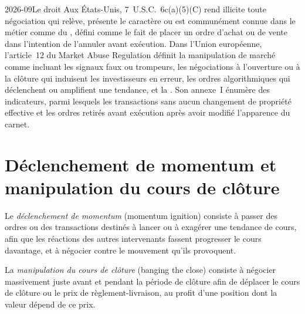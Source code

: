 \begin{dated}{2026-09}{Le droit}\label{dat:s2:manipulative-strategies-and-how-they-are-caught:law}
Aux États-Unis, 7~U.S.C.~6c(a)(5)(C) rend illicite toute négociation qui relève, présente le caractère ou est communément connue dans le métier comme du , défini
comme le fait de placer un ordre d'achat ou de vente dans l'intention de l'annuler avant exécution. Dans l'Union européenne, l'article~12 du Market Abuse Regulation
définit la manipulation de marché comme incluant les signaux faux ou trompeurs, les négociations à l'ouverture ou à la clôture qui induisent les investisseurs en erreur, les ordres algorithmiques qui
déclenchent ou amplifient une tendance, et la . Son annexe~I énumère des indicateurs, parmi lesquels les transactions sans aucun changement
de propriété effective et les ordres retirés avant exécution après avoir modifié l'apparence du carnet.
\end{dated}

\section{Déclenchement de momentum et manipulation du cours de clôture}

\begin{definition}\label{def:s2:manipulative-strategies-and-how-they-are-caught:ignition}
Le \emph{déclenchement de momentum} (momentum ignition) consiste à passer des ordres ou des transactions destinés à lancer ou à exagérer une tendance de cours, afin que les réactions des autres intervenants
fassent progresser le cours davantage, et à négocier contre le mouvement qu'ils provoquent.
\end{definition}

\begin{definition}\label{def:s2:manipulative-strategies-and-how-they-are-caught:close}
La \emph{manipulation du cours de clôture} (banging the close) consiste à négocier massivement juste avant et pendant la période de clôture afin de déplacer
le cours de clôture ou le prix de règlement-livraison, au profit d'une position dont la valeur dépend de ce prix.
\end{definition}

